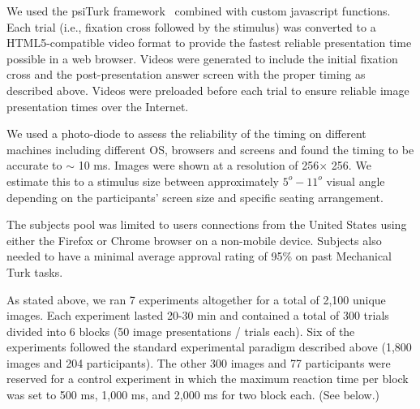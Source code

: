 \documentclass{article}
\begin{document}
We used the psiTurk framework~\citep{mcdonnell2012psiturk} combined with custom javascript functions. Each trial (i.e., fixation cross followed by the stimulus) was converted to a HTML5-compatible video format to provide the fastest reliable presentation time possible in a web browser. Videos were generated to include the initial fixation cross and the post-presentation answer screen with the proper timing as described above. Videos were preloaded before each trial to ensure reliable image presentation times over the Internet. 

We used a photo-diode to assess the reliability of the timing on different machines including different OS, browsers and screens and found the timing to be accurate to $\sim$ 10 ms. Images were shown at a resolution of 256$\times$ 256. We estimate this to a stimulus size between approximately $5^o - 11^o$ visual angle depending on the participants' screen size and specific seating arrangement.  

The subjects pool was limited to users connections from the United States using either the Firefox or Chrome browser on a non-mobile device. Subjects also needed to have a minimal average approval rating of 95\% on past Mechanical Turk tasks.


As stated above, we ran 7 experiments altogether for a total of 2,100 unique images. Each experiment lasted 20-30 min and contained a total of 300 trials divided into 6 blocks (50 image presentations / trials each). Six of the experiments followed the standard experimental paradigm described above (1,800 images and 204 participants). The other 300 images and 77 participants were reserved for a control experiment in which the maximum reaction time per block was set to 500 ms, 1,000 ms, and 2,000 ms for two block each. (See below.) 
\end{document}
